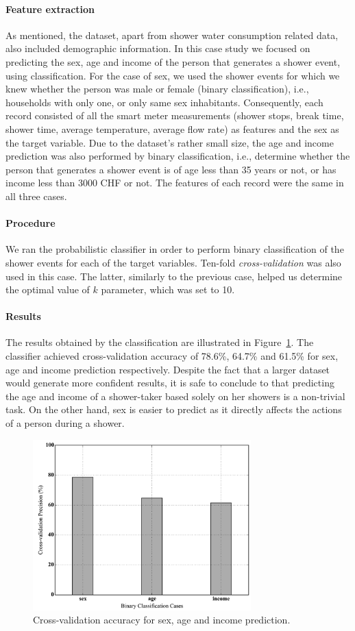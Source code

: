 \paragraph{Feature extraction}
\label{par:feat_extr2}
As mentioned, the dataset, apart from shower water consumption related data, also included demographic information. In this case study we focused on predicting the sex, age and income of the person that generates a shower event, using classification. For the case of sex, we used the shower events for which we knew whether the person was male or female (binary classification), i.e., households with only one, or only same sex inhabitants. Consequently, each record consisted of all the smart meter measurements (shower stops, break time, shower time, average temperature, average flow rate) as features and the sex as the target variable. Due to the dataset's rather small size, the age and income prediction was also performed by binary classification, i.e., determine whether the person that generates a shower event is of age less than 35 years or not, or has income less than 3000 CHF or not. The features of each record were the same in all three cases.

\paragraph{Procedure}
\label{par:procedure2}
We ran the probabilistic classifier in order to perform binary classification of the shower events for each of the target variables. Ten-fold \textit{cross-validation} was also used in this case. The latter, similarly to the previous case, helped us determine the optimal value of $k$ parameter, which was set to 10.

\paragraph{Results}
\label{par:res2}
The results obtained by the classification are illustrated in Figure~\ref{figure10}. The classifier achieved cross-validation accuracy of 78.6\%, 64.7\% and 61.5\% for sex, age and income prediction respectively. Despite the fact that a larger dataset would generate more confident results, it is safe to conclude to that predicting the age and income of a shower-taker based solely on her showers is a non-trivial task. On the other hand, sex is easier to predict as it directly affects the actions of a person during a shower.

 \begin{figure}[!ht]
 	\centering
 	\includegraphics[width=0.75\textwidth]{figures/figure10.pdf}
 	\caption{Cross-validation accuracy for sex, age and income prediction.}	
 	\label{figure10}
 \end{figure}